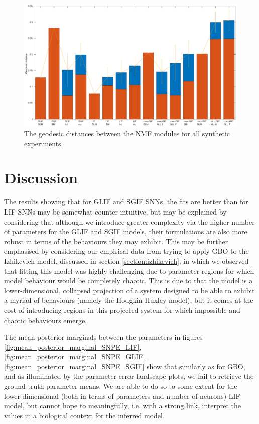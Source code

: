 \documentclass[mphil,deptreport,ianc]{infthesis} %
\begin{document}
\begin{figure}
    \hspace{-0.1\columnwidth}
    \vspace{-0.3in}
    \includegraphics[width=1.75\columnwidth, angle=270]{figures/matlab/NMF_geodesic_all_Synthetic_v2.eps}
    \vspace{-0.3in}
    \caption{The geodesic distances between the NMF modules for all synthetic experiments.}
    \label{fig:geodesic_all}
\end{figure}


\section{Discussion}

The results showing that for GLIF and SGIF SNNs, the fits are better than for LIF SNNs may be somewhat counter-intuitive, but may be explained by considering that although we introduce greater complexity via the higher number of parameters for the GLIF and SGIF models, their formulations are also more robust in terms of the behaviours they may exhibit.
This may be further emphasised by considering our empirical data from trying to apply GBO to the Izhikevich model, discussed in section \ref{section:izhikevich}, in which we observed that fitting this model was highly challenging due to parameter regions for which model behaviour would be completely chaotic.
This is due to that the model is a lower-dimensional, collapsed projection of a system designed to be able to exhibit a myriad of behaviours (namely the Hodgkin-Huxley \cite{HH1952} model), but it comes at the cost of introducing regions in this projected system for which impossible and chaotic behaviours emerge.

The mean posterior marginals between the parameters in figures \ref{fig:mean_posterior_marginal_SNPE_LIF}, \ref{fig:mean_posterior_marginal_SNPE_GLIF}, \ref{fig:mean_posterior_marginal_SNPE_SGIF} show that similarly as for GBO, and as illuminated by the parameter error landscape plots, we fail to retrieve the ground-truth parameter means.
We are able to do so to some extent for the lower-dimensional (both in terms of parameters and number of neurons) LIF model, but cannot hope to meaningfully, i.e. with a strong link, interpret the values in a biological context for the inferred model.
\end{document}
